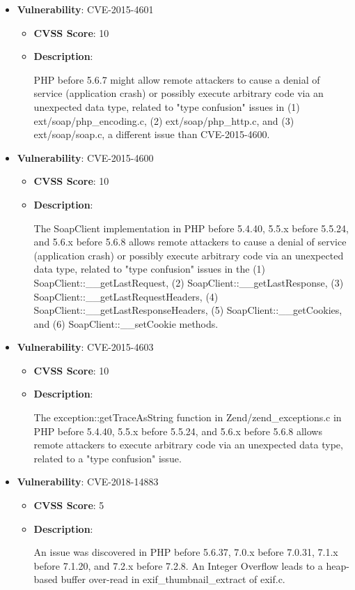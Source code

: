 \documentclass{article}
\begin{document}
\begin{itemize}
        \item \textbf{Vulnerability}: CVE-2015-4601
        \begin{itemize}
            \item \textbf{CVSS Score}:  10 
            \item \textbf{Description}:
            \parbox[t]{0.9\linewidth}{
                \ttfamily PHP before 5.6.7 might allow remote attackers to cause a denial of service (application crash) or possibly execute arbitrary code via an unexpected data type, related to "type confusion" issues in (1) ext/soap/php\_encoding.c, (2) ext/soap/php\_http.c, and (3) ext/soap/soap.c, a different issue than CVE-2015-4600.
            }
        \end{itemize}
    
        \item \textbf{Vulnerability}: CVE-2015-4600
        \begin{itemize}
            \item \textbf{CVSS Score}:  10 
            \item \textbf{Description}:
            \parbox[t]{0.9\linewidth}{
                \ttfamily The SoapClient implementation in PHP before 5.4.40, 5.5.x before 5.5.24, and 5.6.x before 5.6.8 allows remote attackers to cause a denial of service (application crash) or possibly execute arbitrary code via an unexpected data type, related to "type confusion" issues in the (1) SoapClient::\_\_getLastRequest, (2) SoapClient::\_\_getLastResponse, (3) SoapClient::\_\_getLastRequestHeaders, (4) SoapClient::\_\_getLastResponseHeaders, (5) SoapClient::\_\_getCookies, and (6) SoapClient::\_\_setCookie methods.
            }
        \end{itemize}
    
        \item \textbf{Vulnerability}: CVE-2015-4603
        \begin{itemize}
            \item \textbf{CVSS Score}:  10 
            \item \textbf{Description}:
            \parbox[t]{0.9\linewidth}{
                \ttfamily The exception::getTraceAsString function in Zend/zend\_exceptions.c in PHP before 5.4.40, 5.5.x before 5.5.24, and 5.6.x before 5.6.8 allows remote attackers to execute arbitrary code via an unexpected data type, related to a "type confusion" issue.
            }
        \end{itemize}
    
        \item \textbf{Vulnerability}: CVE-2018-14883
        \begin{itemize}
            \item \textbf{CVSS Score}:  5 
            \item \textbf{Description}:
            \parbox[t]{0.9\linewidth}{
                \ttfamily An issue was discovered in PHP before 5.6.37, 7.0.x before 7.0.31, 7.1.x before 7.1.20, and 7.2.x before 7.2.8. An Integer Overflow leads to a heap-based buffer over-read in exif\_thumbnail\_extract of exif.c.
            }
        \end{itemize}
    

\end{itemize}
\end{document}
